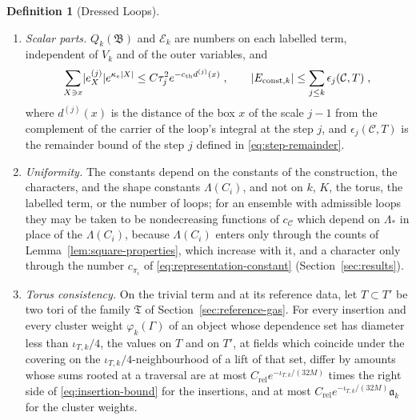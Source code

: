 \documentclass[11pt]{preprint}
\DeclarePairedDelimiter{\abs}{\lvert}{\rvert}
\numberwithin{equation}{section}
\theoremstyle{definition}
\newtheorem{definition}[theorem]{Definition}
\theoremstyle{remark}
\theoremstyle{plain}
\begin{document}
\begin{definition}[Dressed Loops]
\begin{enumerate}[label=(\roman*)]
\begin{equation}\label{eq:production-space}
    \mathcal D_W \coloneqq \bigcup_U\mathcal S_j(U)|_{X^+_W}\;,
\end{equation}
the union over the same configurations $U$ at the step $j$, and at the later steps the insertion of $W$ is the same function of the configuration and of the current, both in fine units. For a group with one interval, from the site $x_W$ to the site $x'_W$, and for $G$-valued gauge transformations $v$,
\begin{equation}\label{eq:covariance-law}
    Y_W(\mathbf U^v, R(v)\mathbf J) = \pi(v(x_W))\,Y_W(\mathbf U, \mathbf J)\,\pi(v(x'_W))^{-1}\;,
\end{equation}
where $\mathbf U^v(b) = v(b_-)\mathbf U(b)v(b_+)^{-1}$ and $(R(v)\mathbf J)(b) = v(b_-)\mathbf J(b)v(b_-)^{-1}$ \cite[(1.10), p.~262]{BalabanRG1}, and $\pi$ is the representation of the loop of $W$; for a group with several intervals each factor of the tensor is transformed in this way.
\item \emph{Scalar parts.} $Q_k(\mathfrak B)$ and $\mathcal E_k$ are numbers on each labelled term, independent of $V_k$ and of the outer variables, and
\begin{equation}\label{eq:scalar-bounds}
    \sum_{X \ni x}\abs{e^{(j)}_X}e^{\kappa_e\abs{X}} \leq C\tau_j^2e^{-c_{\mathrm{th}}d^{(j)}(x)}\;,
    \qquad
    \abs{E_{\mathrm{const},k}} \leq \sum_{j \leq k}\epsilon_j(\mathcal C, T)\;,
\end{equation}
where $d^{(j)}(x)$ is the distance of the box $x$ of the scale $j - 1$ from the complement of the carrier of the loop's integral at the step $j$, and $\epsilon_j(\mathcal C, T)$ is the remainder bound of the step $j$ defined in \eqref{eq:step-remainder}.
\item \emph{Uniformity.} The constants depend on the constants of the construction, the characters, and the shape constants $\Lambda(C_i)$, and not on $k$, $K$, the torus, the labelled term, or the number of loops; for an ensemble with admissible loops they may be taken to be nondecreasing functions of $c_{\mathcal C}$ which depend on $\Lambda_*$ in place of the $\Lambda(C_i)$, because $\Lambda(C_i)$ enters only through the counts of Lemma~\ref{lem:square-properties}, which increase with it, and a character only through the number $c_{\pi_i}$ of \eqref{eq:representation-constant} (Section~\ref{sec:results}).
\item \emph{Torus consistency.} On the trivial term and at its reference data, let $T \subset T'$ be two tori of the family $\mathfrak T$ of Section~\ref{sec:reference-gas}. For every insertion and every cluster weight $\varphi_k(\Gamma)$ of an object whose dependence set has diameter less than $\iota_{T,k}/4$, the values on $T$ and on $T'$, at fields which coincide under the covering on the $\iota_{T,k}/4$-neighbourhood of a lift of that set, differ by amounts whose sums rooted at a traversal are at most $C_{\mathrm{rel}}e^{-\iota_{T,k}/(32M)}$ times the right side of \eqref{eq:insertion-bound} for the insertions, and at most $C_{\mathrm{rel}}e^{-\iota_{T,k}/(32M)}\mathfrak a_k$ for the cluster weights.

\end{enumerate}
\end{definition}
\end{document}
